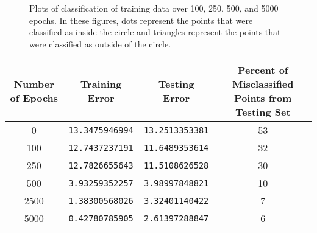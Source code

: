 \documentclass[8pt]{article}
\theoremstyle{definition}
\begin{document}
\begin{figure}[H]
    \centering
    \begin{subfigure}[t]{0.49\textwidth}
    \end{subfigure}
    \hfill
    \begin{subfigure}[t]{0.49\textwidth}
    \end{subfigure}
    \begin{subfigure}[t]{0.49\textwidth}
    \end{subfigure}
    \hfill
    \begin{subfigure}[t]{0.49\textwidth}
    \end{subfigure}
    \caption{Plots of classification of training data over 100, 250, 500, and 5000 epochs. In these figures, dots represent the points that were classified as inside the circle and triangles represent the points that were classified as outside of the circle.}
\end{figure}

\centering
\begin{minipage}{\linewidth}
\label{tab:title}
    \begin{tabular}{ | c | c | c | c |}
    \hline
    Number of Epochs & Training Error & Testing Error & Percent of Misclassified Points from Testing Set \\ \hline
    0 & \texttt{13.3475946994} & \texttt{13.2513353381} & 53 \\ \hline
    100 & \texttt{12.7437237191} & \texttt{11.6489353614} & 32 \\ \hline
    250 & \texttt{12.7826655643} & \texttt{11.5108626528} & 30 \\ \hline
    500 & \texttt{3.93259352257} & \texttt{3.98997848821} & 10 \\ \hline
    2500 & \texttt{1.38300568026} & \texttt{3.32401140422} & 7 \\ \hline
    5000 & \texttt{0.42780785905} & \texttt{2.61397288847} & 6 \\ \hline
    \end{tabular}
\end{minipage}
\end{document}
